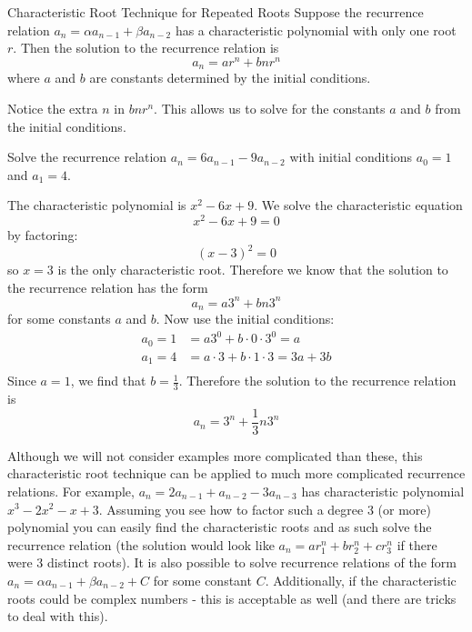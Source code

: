 \documentclass[12pt]{article}
\begin{document}
\begin{defbox}{Characteristic Root Technique for Repeated Roots}
 Suppose the recurrence relation $a_n = \alpha a_{n-1} + \beta a_{n-2}$ has a characteristic polynomial with only one root $r$.  Then the solution to the recurrence relation is
 \[a_n = ar^n + bnr^n\]
 where $a$ and $b$ are constants determined by the initial conditions.
\end{defbox}

Notice the extra $n$ in $bnr^n$.  This allows us to solve for the constants $a$ and $b$ from the initial conditions.

\begin{example}
 Solve the recurrence relation $a_n = 6a_{n-1} - 9a_{n-2}$ with initial conditions $a_0 = 1$ and $a_1 = 4$.  
 \begin{solution}
  The characteristic polynomial is $x^2 - 6x + 9$.  We solve the characteristic equation
  \[x^2 - 6x + 9 = 0\]
  by factoring:
  \[(x - 3)^2 = 0\]
  so $x =3$ is the only characteristic root.  Therefore we know that the solution to the recurrence relation has the form
  \[a_n = a 3^n + bn3^n\]
  for some constants $a$ and $b$.  Now use the initial conditions:
  \begin{align*}
   a_0 = 1 &= a 3^0 + b\cdot 0 \cdot 3^0 = a\\
   a_1 = 4 &= a\cdot 3 + b\cdot 1 \cdot3 = 3a + 3b\\
  \end{align*}
  Since $a = 1$, we find that $b = \frac{1}{3}$.  Therefore the solution to the recurrence relation is
  \[a_n = 3^n + \frac{1}{3}n3^n\]
 \end{solution}


 
\end{example}

 Although we will not consider examples more complicated than these, this characteristic root technique can be applied to much more complicated recurrence relations.  For example, $a_n = 2a_{n-1} + a_{n-2} - 3a_{n-3}$ has characteristic polynomial $x^3 - 2 x^2 - x + 3$.  Assuming you see how to factor such a degree 3 (or more) polynomial you can easily find the characteristic roots and as such solve the recurrence relation (the solution would look like $a_n = ar_1^n + br_2^n + cr_3^n$ if there were 3 distinct roots).  It is also possible to solve recurrence relations of the form $a_n = \alpha a_{n-1} + \beta a_{n-2} + C$ for some constant $C$.  Additionally, if the characteristic roots could be complex numbers - this is acceptable as well (and there are tricks to deal with this).
\end{document}
